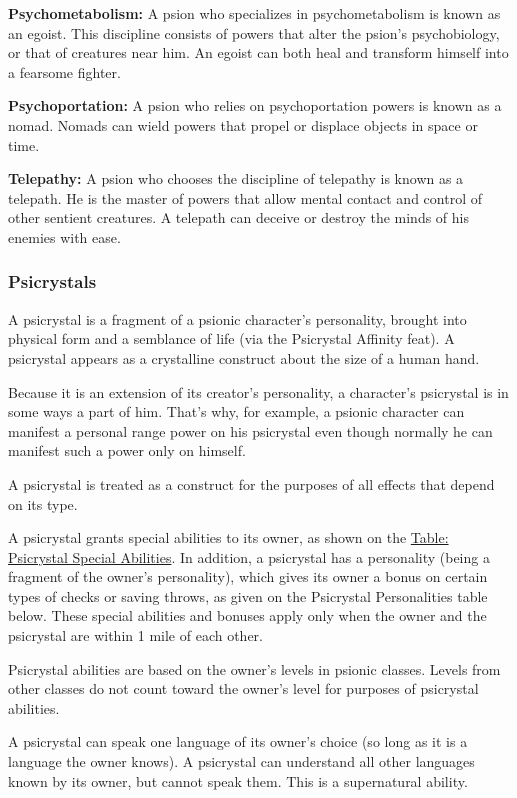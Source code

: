 \textbf{Psychometabolism:} A psion who specializes in psychometabolism is known as an egoist. This discipline consists of powers that alter the psion's psychobiology, or that of creatures near him. An egoist can both heal and transform himself into a fearsome fighter.

\textbf{Psychoportation:} A psion who relies on psychoportation powers is known as a nomad. Nomads can wield powers that propel or displace objects in space or time.

\textbf{Telepathy:} A psion who chooses the discipline of telepathy is known as a telepath. He is the master of powers that allow mental contact and control of other sentient creatures. A telepath can deceive or destroy the minds of his enemies with ease.

\subsubsection{Psicrystals}
A psicrystal is a fragment of a psionic character's personality, brought into physical form and a semblance of life (via the Psicrystal Affinity feat). A psicrystal appears as a crystalline construct about the size of a human hand.

Because it is an extension of its creator's personality, a character's psicrystal is in some ways a part of him. That's why, for example, a psionic character can manifest a personal range power on his psicrystal even though normally he can manifest such a power only on himself.

A psicrystal is treated as a construct for the purposes of all effects that depend on its type.

A psicrystal grants special abilities to its owner, as shown on the \hyperref[tab:Psicrystal Special Abilities]{Table: Psicrystal Special Abilities}. In addition, a psicrystal has a personality (being a fragment of the owner's personality), which gives its owner a bonus on certain types of checks or saving throws, as given on the Psicrystal Personalities table below. These special abilities and bonuses apply only when the owner and the psicrystal are within 1 mile of each other.

Psicrystal abilities are based on the owner's levels in psionic classes. Levels from other classes do not count toward the owner's level for purposes of psicrystal abilities.

A psicrystal can speak one language of its owner's choice (so long as it is a language the owner knows). A psicrystal can understand all other languages known by its owner, but cannot speak them. This is a supernatural ability.

